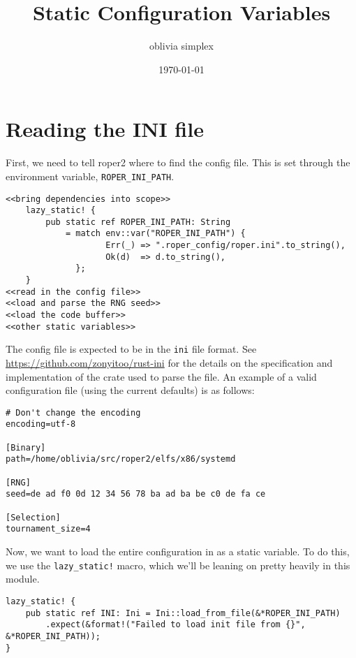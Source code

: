 \documentclass[11pt]{article}
\author{oblivia simplex}
\date{\today}
\title{Static Configuration Variables}
\begin{document}
\maketitle
\tableofcontents


\section{Reading the INI file}
\label{sec:org51cf5fb}

First, we need to tell \gls{roper2} where to find the config file. This is
set through the environment variable, \texttt{ROPER\_INI\_PATH}.
\lstset{language=rust,label= ,caption= ,captionpos=b,numbers=none}
\begin{lstlisting}
<<bring dependencies into scope>>
    lazy_static! {
        pub static ref ROPER_INI_PATH: String
            = match env::var("ROPER_INI_PATH") {
                    Err(_) => ".roper_config/roper.ini".to_string(),
                    Ok(d)  => d.to_string(),
              };
    }
<<read in the config file>>
<<load and parse the RNG seed>>
<<load the code buffer>>
<<other static variables>>
\end{lstlisting}

The config file is expected to be in the \texttt{ini} file format. See 
\url{https://github.com/zonyitoo/rust-ini} for the details on the specification
and implementation of the crate used to parse the file. An example of a 
valid configuration file (using the current defaults) is as follows:

\begin{verbatim}
# Don't change the encoding
encoding=utf-8

[Binary]
path=/home/oblivia/src/roper2/elfs/x86/systemd

[RNG]
seed=de ad f0 0d 12 34 56 78 ba ad ba be c0 de fa ce

[Selection]
tournament_size=4
\end{verbatim}

Now, we want to load the entire configuration in as a static variable.
To do this, we use the \texttt{lazy\_static!} macro, which we'll be leaning on
pretty heavily in this module. 

\lstset{language=rust,label=org0769949,caption= ,captionpos=b,numbers=none}
\begin{lstlisting}
lazy_static! {
    pub static ref INI: Ini = Ini::load_from_file(&*ROPER_INI_PATH)
        .expect(&format!("Failed to load init file from {}", &*ROPER_INI_PATH));
}
\end{lstlisting}
\end{document}
